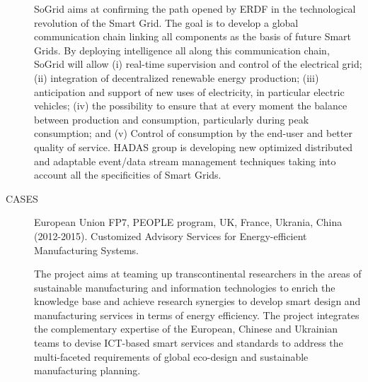 \begin{description}
SoGrid aims at confirming the path opened by ERDF in the technological revolution of the Smart Grid. The goal is to develop a global communication chain linking all components as the basis of future Smart Grids. By deploying intelligence all along this communication chain, SoGrid will allow (i) real-time supervision and control of the electrical grid; (ii) integration of decentralized renewable energy production; (iii) anticipation and support of new uses of electricity, in particular electric vehicles; (iv) the possibility to ensure that at every moment the  balance between production and consumption, particularly during peak consumption;  and (v) Control of consumption by the end-user and better quality of service. HADAS group is developing new optimized distributed and adaptable event/data stream management techniques taking into account all the specificities of  Smart Grids.



\item[CASES] European Union FP7, PEOPLE program, UK, France, Ukrania, China  (2012-2015).
Customized Advisory Services for Energy-efficient Manufacturing Systems.   

The project aims at teaming up transcontinental researchers in the areas of sustainable manufacturing and information technologies to enrich the knowledge base and achieve research synergies to develop smart design and manufacturing services in terms of energy efficiency. The project 
 integrates the complementary expertise of the European, Chinese and Ukrainian teams to devise ICT-based smart services and standards to address the multi-faceted requirements of global eco-design and sustainable manufacturing planning.






\end{description}
